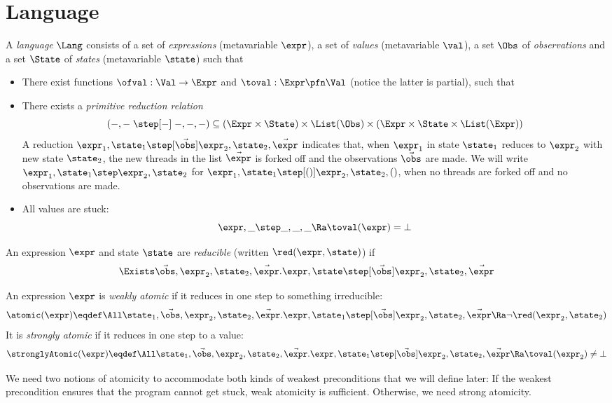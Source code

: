 \section{Language}
\label{sec:language}

A \emph{language} $\Lang$ consists of a set \Expr{} of \emph{expressions} (metavariable $\expr$), a set \Val{} of \emph{values} (metavariable $\val$), a set $\Obs$ of \emph{observations} and a set $\State$ of \emph{states} (metavariable $\state$) such that
\begin{itemize}[itemsep=0pt]
\item There exist functions $\ofval : \Val \to \Expr$ and $\toval : \Expr \pfn \Val$ (notice the latter is partial), such that
\item There exists a \emph{primitive reduction relation} \[(-,- \;\step[-]\; -,-,-) \subseteq (\Expr \times \State) \times \List(\Obs) \times (\Expr \times \State \times \List(\Expr))\]
  A reduction $\expr_1, \state_1 \step[\vec\obs] \expr_2, \state_2, \vec\expr$ indicates that, when $\expr_1$ in state $\state_1$ reduces to $\expr_2$ with new state $\state_2$, the new threads in the list $\vec\expr$ is forked off and the observations $\vec\obs$ are made.
  We will write $\expr_1, \state_1 \step \expr_2, \state_2$ for $\expr_1, \state_1 \step[()] \expr_2, \state_2, ()$, \ie when no threads are forked off and no observations are made. \\
\item All values are stuck:
\[ \expr, \_ \step  \_, \_, \_ \Ra \toval(\expr) = \bot \]
\end{itemize}

\begin{defn}
  An expression $\expr$ and state $\state$ are \emph{reducible} (written $\red(\expr, \state)$) if
  \[ \Exists \vec\obs, \expr_2, \state_2, \vec\expr. \expr,\state \step[\vec\obs] \expr_2,\state_2,\vec\expr \]
\end{defn}

\begin{defn}
  An expression $\expr$ is \emph{weakly atomic} if it reduces in one step to something irreducible:
  \[ \atomic(\expr) \eqdef \All\state_1, \vec\obs, \expr_2, \state_2, \vec\expr. \expr, \state_1 \step[\vec\obs] \expr_2, \state_2, \vec\expr \Ra \lnot \red(\expr_2, \state_2) \]
  It is \emph{strongly atomic} if it reduces in one step to a value:
  \[ \stronglyAtomic(\expr) \eqdef \All\state_1, \vec\obs, \expr_2, \state_2, \vec\expr. \expr, \state_1 \step[\vec\obs] \expr_2, \state_2, \vec\expr \Ra \toval(\expr_2) \neq \bot \]
\end{defn}
We need two notions of atomicity to accommodate both kinds of weakest preconditions that we will define later:
If the weakest precondition ensures that the program cannot get stuck, weak atomicity is sufficient.
Otherwise, we need strong atomicity.

